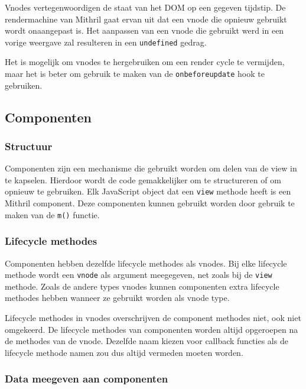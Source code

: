 Vnodes vertegenwoordigen de staat van het DOM op een gegeven tijdstip. De rendermachine van Mithril gaat ervan uit dat een vnode die opnieuw gebruikt wordt onaangepast is. Het aanpassen van een vnode die gebruikt werd in een vorige weergave zal resulteren in een \texttt{undefined} gedrag. \autocite{Mithril2019g}

Het is mogelijk om vnodes te hergebruiken om een render cycle te vermijden, maar het is beter om gebruik te maken van de \texttt{onbeforeupdate} hook te gebruiken.  \autocite{Mithril2019g}

\subsection{Componenten}
\subsubsection{Structuur}

Componenten zijn een mechanisme die gebruikt worden om delen van de view in te kapselen. Hierdoor wordt de code gemakkelijker om te structureren of om opnieuw te gebruiken. Elk JavaScript object dat een \texttt{view} methode heeft is een Mithril component. Deze componenten kunnen gebruikt worden door gebruik te maken van de \texttt{m()} functie. \autocite{Mithril2019a}

\subsubsection{Lifecycle methodes}

Componenten hebben dezelfde lifecycle methodes als vnodes. Bij elke lifecycle methode wordt een \texttt{vnode} als argument meegegeven, net zoals bij de \texttt{view} methode. Zoals de andere types vnodes kunnen componenten extra lifecycle methodes hebben wanneer ze gebruikt worden als vnode type. \autocite{Mithril2019a}

Lifecycle methodes in vnodes overschrijven de component methodes niet, ook niet omgekeerd. De lifecycle methodes van componenten worden altijd opgeroepen na de methodes van de vnode. Dezelfde naam kiezen voor callback functies als de lifecycle methode namen zou dus altijd vermeden moeten worden. \autocite{Mithril2019a}

\subsubsection{Data meegeven aan componenten}

